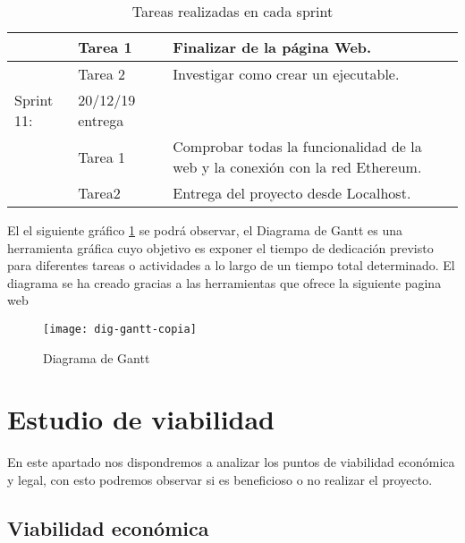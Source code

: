 \begin{table}[H]
\begin{tabular}{|p{1.5cm}|p{1.5cm}|p{5cm}}
                         & Tarea 1                       & \multicolumn{1}{p{9.2cm}|}{Finalizar de la página Web.}                                                                  \\ \hline
                         & Tarea 2                       & \multicolumn{1}{p{9.2cm}|}{Investigar como crear un ejecutable.}                                                         \\ \hline
Sprint 11:               & 20/12/19  entrega  & \multicolumn{1}{l|}{}                                                                                             \\ \hline
                         & Tarea 1                       & \multicolumn{1}{p{9.2cm}|}{Comprobar todas la funcionalidad de la web y la conexión con la red Ethereum.}                \\ \hline
                         & Tarea2                        & \multicolumn{1}{p{9.2cm}|}{Entrega del proyecto desde Localhost.}                                                        \\ \hline
\end{tabular}
\caption{Tareas realizadas en cada sprint}
\label{tabla:sprint1}
\end{table}

El el siguiente gráfico \ref{ref:gantt} se podrá observar, el Diagrama de Gantt \cite{gantt} es una herramienta gráfica cuyo objetivo es exponer el tiempo de dedicación previsto para diferentes tareas o actividades a lo largo de un tiempo total determinado. El diagrama se ha creado gracias a las herramientas que ofrece la siguiente pagina web \cite{ganttGrafico}

\begin{figure}[H]
    \centering
    \texttt{[image: dig-gantt-copia]}
    \caption{Diagrama de Gantt}
    \label{ref:gantt}
\end{figure}

\section{Estudio de viabilidad}

En este apartado nos dispondremos a analizar los puntos de  viabilidad económica y legal, con esto podremos observar si es beneficioso o no realizar el proyecto.

\subsection{Viabilidad económica}

